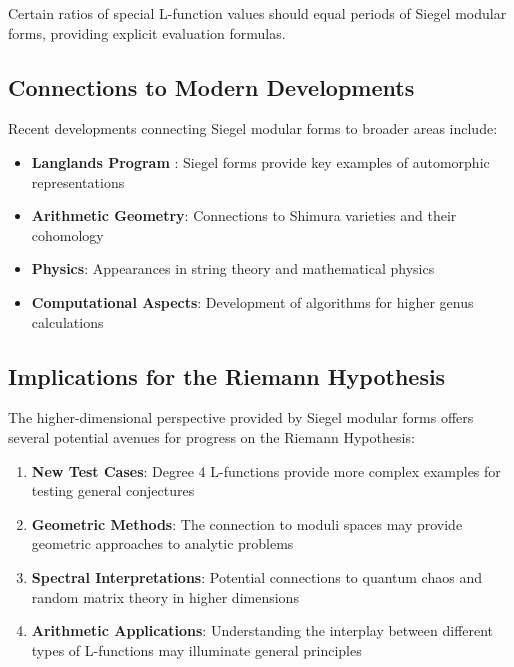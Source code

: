 \begin{conjecture}
Certain ratios of special L-function values should equal periods of Siegel modular forms, providing explicit evaluation formulas.
\end{conjecture}

\subsection{Connections to Modern Developments}

Recent developments connecting Siegel modular forms to broader areas include:

\begin{itemize}
\item \textbf{Langlands Program} \cite{langlands1976}: Siegel forms provide key examples of automorphic representations
\item \textbf{Arithmetic Geometry}: Connections to Shimura varieties and their cohomology
\item \textbf{Physics}: Appearances in string theory and mathematical physics
\item \textbf{Computational Aspects}: Development of algorithms for higher genus calculations
\end{itemize}

\subsection{Implications for the Riemann Hypothesis}

The higher-dimensional perspective provided by Siegel modular forms offers several potential avenues for progress on the Riemann Hypothesis:

\begin{enumerate}
\item \textbf{New Test Cases}: Degree 4 L-functions provide more complex examples for testing general conjectures
\item \textbf{Geometric Methods}: The connection to moduli spaces may provide geometric approaches to analytic problems
\item \textbf{Spectral Interpretations}: Potential connections to quantum chaos and random matrix theory in higher dimensions
\item \textbf{Arithmetic Applications}: Understanding the interplay between different types of L-functions may illuminate general principles
\end{enumerate}

